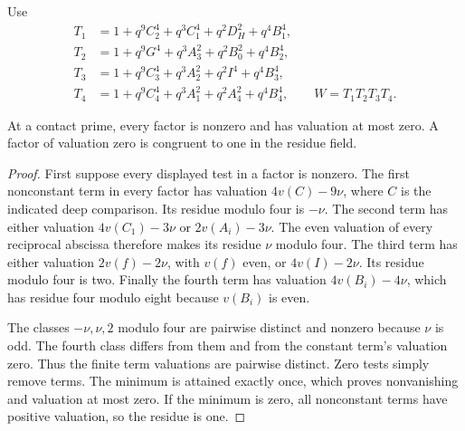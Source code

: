 \documentclass[11pt,a4paper]{article}
\begin{document}
Use
\begin{align*}
 T_1&=1+q^9C_2^4+q^3C_1^4+q^2D_H^2+q^4B_1^4,\\
 T_2&=1+q^9G^4+q^3A_3^2+q^2B_0^2+q^4B_2^4,\\
 T_3&=1+q^9C_3^4+q^3A_2^2+q^2I^4+q^4B_3^4,\\
 T_4&=1+q^9C_4^4+q^3A_1^2+q^2A_4^2+q^4B_4^4,
 \qquad W=T_1T_2T_3T_4.
\end{align*}

\begin{lemma}\label{lem:residues}
At a contact prime, every factor is nonzero and has valuation at most
zero. A factor of valuation zero is congruent to one in the residue field.
\end{lemma}
\begin{proof}
First suppose every displayed test in a factor is nonzero.
The first nonconstant term in every factor has valuation
$4v(C)-9\nu$, where $C$ is the indicated deep comparison.
Its residue modulo four is $-\nu$.
The second term has either valuation $4v(C_1)-3\nu$ or
$2v(A_i)-3\nu$. The even valuation of every reciprocal abscissa
therefore makes its residue $\nu$ modulo four.
The third term has either valuation $2v(f)-2\nu$, with $v(f)$
even, or $4v(I)-2\nu$. Its residue modulo four is two.
Finally the fourth term has valuation $4v(B_i)-4\nu$,
which has residue four modulo eight because $v(B_i)$ is even.

The classes $-\nu,\nu,2$ modulo four are pairwise distinct and
nonzero because $\nu$ is odd. The fourth class differs from them
and from the constant term's valuation zero. Thus the finite term
valuations are pairwise distinct. Zero tests simply remove terms.
The minimum is attained exactly once, which proves nonvanishing
and valuation at most zero. If the minimum is zero, all
nonconstant terms have positive valuation, so the residue is one.
\end{proof}
\end{document}
